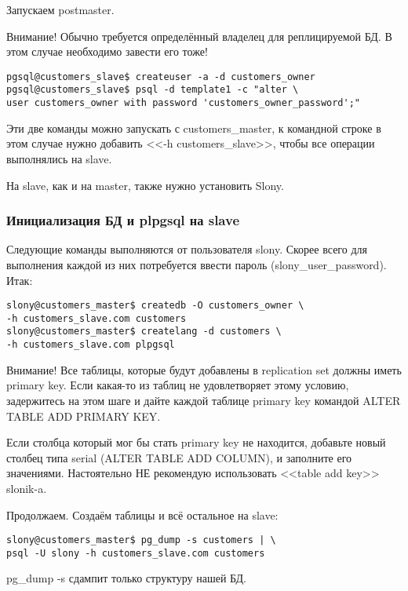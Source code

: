Запускаем postmaster.

Внимание! Обычно требуется определённый владелец для реплицируемой БД. В этом случае необходимо завести его тоже!
\begin{lstlisting}[label=lst:slony5,caption=Подготовка одного slave-сервера]
pgsql@customers_slave$ createuser -a -d customers_owner
pgsql@customers_slave$ psql -d template1 -c "alter \
user customers_owner with password 'customers_owner_password';"
\end{lstlisting}

Эти две команды можно запускать с customers\_master, к командной строке в этом случае нужно добавить 
<<-h customers\_slave>>, чтобы все операции выполнялись на slave.

На slave, как и на master, также нужно установить Slony.

\subsubsection{Инициализация БД и plpgsql на slave}

Следующие команды выполняются от пользователя slony. Скорее всего для выполнения каждой из них потребуется 
ввести пароль (slony\_user\_password). Итак:
\begin{lstlisting}[label=lst:slony6,caption=Инициализация БД и plpgsql на slave]
slony@customers_master$ createdb -O customers_owner \
-h customers_slave.com customers
slony@customers_master$ createlang -d customers \
-h customers_slave.com plpgsql
\end{lstlisting}

Внимание! Все таблицы, которые будут добавлены в replication set должны иметь primary key. 
Если какая-то из таблиц не удовлетворяет этому условию, задержитесь на этом шаге и дайте каждой таблице primary key 
командой ALTER TABLE ADD PRIMARY KEY.

Если столбца который мог бы стать primary key не находится, добавьте новый столбец типа serial (ALTER TABLE ADD COLUMN), 
и заполните его значениями. Настоятельно НЕ рекомендую использовать <<table add key>> slonik-a.

Продолжаем.
Создаём таблицы и всё остальное на slave:
\begin{lstlisting}[label=lst:slony7,caption=Инициализация БД и plpgsql на slave]
slony@customers_master$ pg_dump -s customers | \
psql -U slony -h customers_slave.com customers
\end{lstlisting}

pg\_dump -s сдампит только структуру нашей БД.

